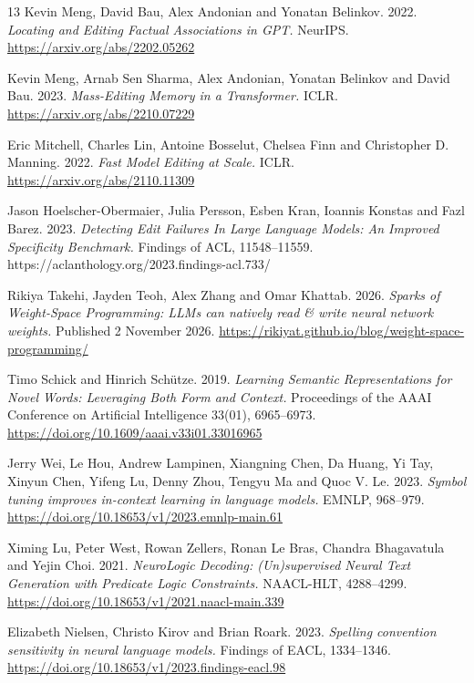 \begin{thebibliography}{13}
Kevin Meng, David Bau, Alex Andonian and Yonatan Belinkov. 2022.
\emph{Locating and Editing Factual Associations in GPT.} NeurIPS.
\url{https://arxiv.org/abs/2202.05262}

Kevin Meng, Arnab Sen Sharma, Alex Andonian, Yonatan Belinkov and David
Bau. 2023. \emph{Mass-Editing Memory in a Transformer.} ICLR.
\url{https://arxiv.org/abs/2210.07229}

Eric Mitchell, Charles Lin, Antoine Bosselut, Chelsea Finn and
Christopher D. Manning. 2022. \emph{Fast Model Editing at Scale.} ICLR.
\url{https://arxiv.org/abs/2110.11309}

Jason Hoelscher-Obermaier, Julia Persson, Esben Kran, Ioannis Konstas
and Fazl Barez. 2023. \emph{Detecting Edit Failures In Large Language
Models: An Improved Specificity Benchmark.} Findings of ACL,
11548--11559. https://aclanthology.org/2023.findings-acl.733/

Rikiya Takehi, Jayden Teoh, Alex Zhang and Omar Khattab. 2026.
\emph{Sparks of Weight-Space Programming: LLMs can natively read \&
write neural network weights.} Published 2 November 2026.
\url{https://rikiyat.github.io/blog/weight-space-programming/}

Timo Schick and Hinrich Schütze. 2019.
\emph{Learning Semantic Representations for Novel Words: Leveraging Both Form and Context.}
Proceedings of the AAAI Conference on Artificial Intelligence 33(01), 6965--6973.
\url{https://doi.org/10.1609/aaai.v33i01.33016965}

Jerry Wei, Le Hou, Andrew Lampinen, Xiangning Chen, Da Huang, Yi Tay,
Xinyun Chen, Yifeng Lu, Denny Zhou, Tengyu Ma and Quoc V. Le. 2023.
\emph{Symbol tuning improves in-context learning in language models.}
EMNLP, 968--979. \url{https://doi.org/10.18653/v1/2023.emnlp-main.61}

Ximing Lu, Peter West, Rowan Zellers, Ronan Le Bras, Chandra Bhagavatula
and Yejin Choi. 2021.
\emph{NeuroLogic Decoding: (Un)supervised Neural Text Generation with Predicate Logic Constraints.}
NAACL-HLT, 4288--4299. \url{https://doi.org/10.18653/v1/2021.naacl-main.339}

Elizabeth Nielsen, Christo Kirov and Brian Roark. 2023.
\emph{Spelling convention sensitivity in neural language models.}
Findings of EACL, 1334--1346.
\url{https://doi.org/10.18653/v1/2023.findings-eacl.98}


\end{thebibliography}
